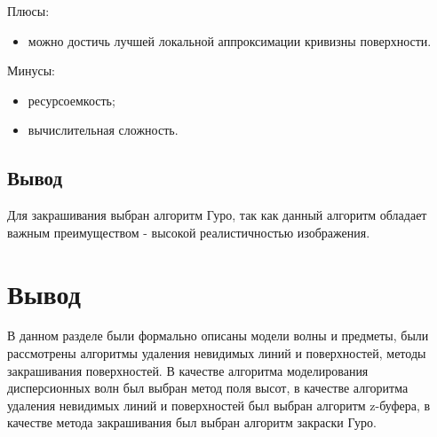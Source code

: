 Плюсы:

\begin{itemize}
	\item можно достичь лучшей локальной аппроксимации кривизны поверхности.
\end{itemize}

Минусы:

\begin{itemize}
	\item ресурсоемкость;
	\item вычислительная сложность.
\end{itemize}

\subsection*{Вывод}

Для закрашивания выбран алгоритм Гуро, так как данный алгоритм обладает важным преимуществом - высокой реалистичностью изображения.

\section*{Вывод}

В данном разделе были формально описаны модели волны и
предметы, были рассмотрены алгоритмы удаления невидимых линий и поверхностей, методы закрашивания поверхностей. В качестве алгоритма моделирования дисперсионных волн был выбран метод поля высот, в качестве алгоритма удаления невидимых линий и поверхностей был выбран алгоритм z-буфера, в качестве метода закрашивания был выбран алгоритм закраски Гуро.